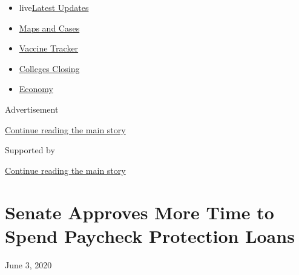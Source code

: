 \begin{itemize}
\tightlist
\item
  live\href{https://www.nytimes3xbfgragh.onion/2020/08/21/world/covid-19-coronavirus.html?name=styln-coronavirus-markets\&region=TOP_BANNER\&variant=undefined\&block=storyline_menu_recirc\&action=click\&pgtype=Article\&impression_id=99c3e651-e39b-11ea-bae2-edbc4ce8b9dc}{Latest
  Updates}
\item
  \href{https://www.nytimes3xbfgragh.onion/interactive/2020/us/coronavirus-us-cases.html?name=styln-coronavirus-markets\&region=TOP_BANNER\&variant=undefined\&block=storyline_menu_recirc\&action=click\&pgtype=Article\&impression_id=99cd0e10-e39b-11ea-bae2-edbc4ce8b9dc}{Maps
  and Cases}
\item
  \href{https://www.nytimes3xbfgragh.onion/interactive/2020/science/coronavirus-vaccine-tracker.html?name=styln-coronavirus-markets\&region=TOP_BANNER\&variant=undefined\&block=storyline_menu_recirc\&action=click\&pgtype=Article\&impression_id=99cd3520-e39b-11ea-bae2-edbc4ce8b9dc}{Vaccine
  Tracker}
\item
  \href{https://www.nytimes3xbfgragh.onion/2020/08/19/us/colleges-closing-covid.html?name=styln-coronavirus-markets\&region=TOP_BANNER\&variant=undefined\&block=storyline_menu_recirc\&action=click\&pgtype=Article\&impression_id=99cd3521-e39b-11ea-bae2-edbc4ce8b9dc}{Colleges
  Closing}
\item
  \href{https://www.nytimes3xbfgragh.onion/live/2020/08/20/business/stock-market-today-coronavirus?name=styln-coronavirus-markets\&region=TOP_BANNER\&variant=undefined\&block=storyline_menu_recirc\&action=click\&pgtype=Article\&impression_id=99cd3522-e39b-11ea-bae2-edbc4ce8b9dc}{Economy}
\end{itemize}

Advertisement

\protect\hyperlink{after-top}{Continue reading the main story}

Supported by

\protect\hyperlink{after-sponsor}{Continue reading the main story}

\hypertarget{senate-approves-more-time-to-spend-paycheck-protection-loans}{%
\section{Senate Approves More Time to Spend Paycheck Protection
Loans}\label{senate-approves-more-time-to-spend-paycheck-protection-loans}}

June 3, 2020

